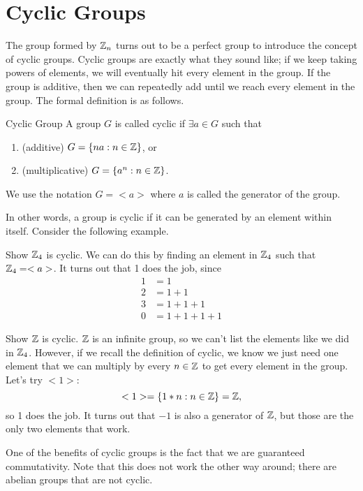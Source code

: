 \section{Cyclic Groups}
The group formed by $\mathbb{Z}_{n}$ turns out to be a perfect group to introduce the concept of cyclic groups. Cyclic groups are exactly what they sound like; if we keep taking powers of elements, we will eventually hit every element in the group. If the group is additive, then we can repeatedly add until we reach every element in the group. The formal definition is as follows.
\begin{definition}{Cyclic Group}
    A group $G$ is called cyclic if $\exists a\in G$ such that
    \begin{enumerate}
        \item (additive) $G=\{na:n\in\mathbb{Z}\}$, or
        \item (multiplicative) $G=\{a^{n}:n\in\mathbb{Z}\}$.
    \end{enumerate}
    We use the notation $G=<a>$ where $a$ is called the generator of the group.
\end{definition}
In other words, a group is cyclic if it can be generated by an element within itself. Consider the following example.

\begin{example}{Show $\mathbb{Z}_{4}$ is cyclic.}
    We can do this by finding an element in $\mathbb{Z}_{4}$ such that $\mathbb{Z}_{4}=<a>$. It turns out that 1 does the job, since
    \begin{align*}
        1 &= 1\\
        2 &= 1 + 1\\
        3 &= 1 + 1 + 1\\
        0 &= 1 + 1 + 1 + 1
    \end{align*}
\end{example}

\begin{example}{Show $\mathbb{Z}$ is cyclic.}
    $\mathbb{Z}$ is an infinite group, so we can't list the elements like we did in $\mathbb{Z}_{4}$. However, if we recall the definition of cyclic, we know we just need one element that we can multiply by every $n\in\mathbb{Z}$ to get every element in the group. Let's try $<1>$:
    \[
        <1>=\{1*n:n\in\mathbb{Z}\}=\mathbb{Z},
    \]
    so 1 does the job. It turns out that $-1$ is also a generator of $\mathbb{Z}$, but those are the only two elements that work.
\end{example}

One of the benefits of cyclic groups is the fact that we are guaranteed commutativity. Note that this does not work the other way around; there are abelian groups that are not cyclic.


